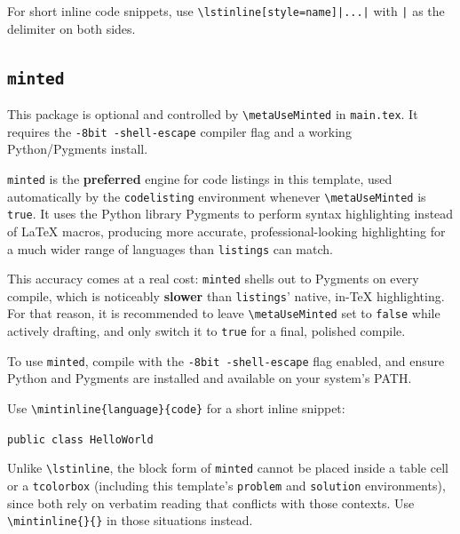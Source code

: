 	For short inline code snippets, use \texttt{\textbackslash lstinline[style=name]|...|} with \texttt{|} as the delimiter on both sides.
	
	\subsection{\texttt{minted}}\label{sec:minted}
	\noindent\colorbox{themecolour!15}{\parbox{\linewidth}{\small This package is optional and controlled by \texttt{\textbackslash metaUseMinted} in \texttt{main.tex}. It requires the \texttt{-8bit -shell-escape} compiler flag and a working Python/Pygments install.}}\vspace{0.5\baselineskip}
	
	\texttt{minted} is the \textbf{preferred} engine for code listings in this template, used automatically by the \texttt{codelisting} environment whenever \texttt{\textbackslash metaUseMinted} is \texttt{true}. It uses the Python library Pygments to perform syntax highlighting instead of \LaTeX{} macros, producing more accurate, professional-looking highlighting for a much wider range of languages than \texttt{listings} can match.
	
	This accuracy comes at a real cost: \texttt{minted} shells out to Pygments on every compile, which is noticeably \textbf{slower} than \texttt{listings}' native, in-\TeX{} highlighting. For that reason, it is recommended to leave \texttt{\textbackslash metaUseMinted} set to \texttt{false} while actively drafting, and only switch it to \texttt{true} for a final, polished compile.
	
	\ifmetaUseMinted
	
	To use \texttt{minted}, compile with the \texttt{-8bit -shell-escape} flag enabled, and ensure Python and Pygments are installed and available on your system's PATH.
	
	Use \texttt{\textbackslash mintinline\{language\}\{code\}} for a short inline snippet:
	
	\texttt{public class HelloWorld {}
	}
	
	Unlike \texttt{\textbackslash lstinline}, the block form of \texttt{minted} cannot be placed inside a table cell or a \texttt{tcolorbox} (including this template's \texttt{problem} and \texttt{solution} environments), since both rely on verbatim reading that conflicts with those contexts. Use \texttt{\textbackslash mintinline\{\}\{\}} in those situations instead.
	

